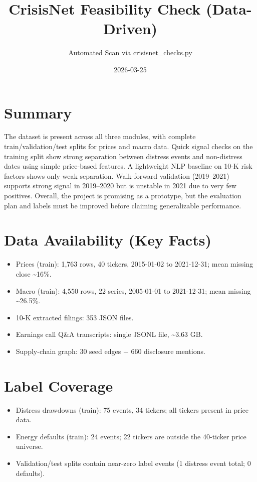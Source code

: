 \documentclass[11pt]{article}
\title{CrisisNet Feasibility Check (Data-Driven)}
\author{Automated Scan via crisisnet\_checks.py}
\date{2026-03-25}
\begin{document}
\maketitle

\section*{Summary}
The dataset is present across all three modules, with complete train/validation/test splits for prices and macro data. Quick signal checks on the training split show strong separation between distress events and non-distress dates using simple price-based features. A lightweight NLP baseline on 10-K risk factors shows only weak separation. Walk-forward validation (2019--2021) supports strong signal in 2019--2020 but is unstable in 2021 due to very few positives. Overall, the project is promising as a prototype, but the evaluation plan and labels must be improved before claiming generalizable performance.

\section*{Data Availability (Key Facts)}
\begin{itemize}
  \item Prices (train): 1,763 rows, 40 tickers, 2015-01-02 to 2021-12-31; mean missing close \textasciitilde 16\%.
  \item Macro (train): 4,550 rows, 22 series, 2005-01-01 to 2021-12-31; mean missing \textasciitilde 26.5\%.
  \item 10-K extracted filings: 353 JSON files.
  \item Earnings call Q\&A transcripts: single JSONL file, \textasciitilde 3.63 GB.
  \item Supply-chain graph: 30 seed edges + 660 disclosure mentions.
\end{itemize}

\section*{Label Coverage}
\begin{itemize}
  \item Distress drawdowns (train): 75 events, 34 tickers; all tickers present in price data.
  \item Energy defaults (train): 24 events; 22 tickers are outside the 40-ticker price universe.
  \item Validation/test splits contain near-zero label events (1 distress event total; 0 defaults).
\end{itemize}
\end{document}
